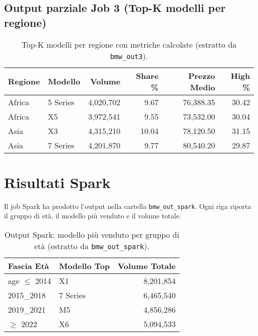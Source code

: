		\subsection*{Output parziale Job 3 (Top-K modelli per regione)}
			\begin{table}[H]
				\centering
				\begin{tabular}{l l r r r r}
					\hline
					\textbf{Regione} & \textbf{Modello} & \textbf{Volume} & \textbf{Share \%} & \textbf{Prezzo Medio} & \textbf{High \%} \\
					\hline
					Africa                & 5 Series         & 4,020,702       & 9.67              & 76,388.35             & 30.42            \\
					Africa                & X5               & 3,972,541       & 9.55              & 73,532.00             & 30.04            \\
					Asia                  & X3               & 4,315,210       & 10.04             & 78,120.50             & 31.15            \\
					Asia                  & 7 Series         & 4,201,870       & 9.77              & 80,540.20             & 29.87            \\
					\hline
				\end{tabular}
				\caption{Top-K modelli per regione con metriche calcolate (estratto da \texttt{bmw\_out3}).}
				\label{tab:mr_output3}
			\end{table}
	
	\section{Risultati Spark}
		Il job Spark ha prodotto l’output nella cartella \texttt{bmw\_out\_spark}.
		Ogni riga riporta il gruppo di età, il modello più venduto e il volume totale.
		
		\begin{table}[H]
			\centering
			\begin{tabular}{l l r}
				\hline
				\textbf{Fascia Età} & \textbf{Modello Top} & \textbf{Volume Totale} \\
				\hline
				age $\leq$ 2014         & X1                   & 8,201,854              \\
				2015\_2018              & 7 Series             & 6,465,540              \\
				2019\_2021              & M5                   & 4,856,286              \\
				$\geq$ 2022             & X6                   & 5,094,533              \\
				\hline
			\end{tabular}
			\caption{Output Spark: modello più venduto per gruppo di età (estratto da \texttt{bmw\_out\_spark}).}
			\label{tab:spark_output}
		\end{table}
	
